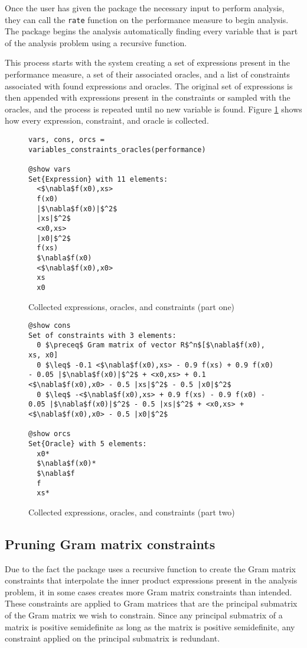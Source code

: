 Once the user has given the package the necessary input to perform analysis, they can call the \texttt{rate} function on the performance measure to begin analysis. The package begins the analysis automatically finding every variable that is part of the analysis problem using a recursive function.

This process starts with the system creating a set of expressions present in the performance measure, a set of their associated oracles, and a list of constraints associated with found expressions and oracles. The original set of expressions is then appended with expressions present in the constraints or sampled with the oracles, and the process is repeated until no new variable is found. Figure \ref*{ex_collect1} shows how every expression, constraint, and oracle is collected. 

\begin{figure}[h!]
    \begin{lstlisting}[mathescape]
vars, cons, orcs = variables_constraints_oracles(performance)

@show vars
Set{Expression} with 11 elements:
  <$\nabla$f(x0),xs>
  f(x0)
  |$\nabla$f(x0)|$^2$
  |xs|$^2$
  <x0,xs>
  |x0|$^2$
  f(xs)
  $\nabla$f(x0)
  <$\nabla$f(x0),x0>
  xs
  x0
\end{lstlisting}
\caption{Collected expressions, oracles, and constraints (part one)}
\label{ex_collect1}
\end{figure}

\begin{figure}[H]
\ContinuedFloat
\begin{lstlisting}[mathescape]
@show cons
Set of constraints with 3 elements:
  0 $\preceq$ Gram matrix of vector R$^n$[$\nabla$f(x0), xs, x0]
  0 $\leq$ -0.1 <$\nabla$f(x0),xs> - 0.9 f(xs) + 0.9 f(x0) - 0.05 |$\nabla$f(x0)|$^2$ + <x0,xs> + 0.1 <$\nabla$f(x0),x0> - 0.5 |xs|$^2$ - 0.5 |x0|$^2$
  0 $\leq$ -<$\nabla$f(x0),xs> + 0.9 f(xs) - 0.9 f(x0) - 0.05 |$\nabla$f(x0)|$^2$ - 0.5 |xs|$^2$ + <x0,xs> + <$\nabla$f(x0),x0> - 0.5 |x0|$^2$

@show orcs
Set{Oracle} with 5 elements:
  x0*
  $\nabla$f(x0)*
  $\nabla$f
  f
  xs*
\end{lstlisting}    
\caption{Collected expressions, oracles, and constraints (part two)}
\label{ex_collect2}
\end{figure}

\subsection*{Pruning Gram matrix constraints}
Due to the fact the package uses a recursive function to create the Gram matrix constraints that interpolate the inner product expressions present in the analysis problem, it in some cases creates more Gram matrix constraints than intended. These constraints are applied to Gram matrices that are the principal submatrix of the Gram matrix we wish to constrain. Since any principal submatrix of a matrix is positive semidefinite as long as the matrix is positive semidefinite, any constraint applied on the principal submatrix is redundant.%

